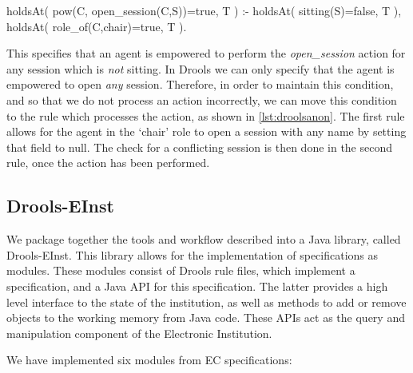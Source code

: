 \begin{prologinline}
holdsAt( pow(C, open_session(C,S))=true, T ) :-
	holdsAt( sitting(S)=false, T ),
	holdsAt( role_of(C,chair)=true, T ).
\end{prologinline}

This specifies that an agent is empowered to perform the \emph{open\_session}
action for any session which is \emph{not} sitting. In Drools we can only
specify that the agent is empowered to open \emph{any} session. Therefore, in
order to maintain this condition, and so that we do not process an action
incorrectly, we can move this condition to the rule which processes the
action, as shown in \autoref{lst:droolsanon}. The first rule allows for the
agent in the `chair' role to open a session with any name by setting that
field to null. The check for a conflicting session is then done in the second
rule, once the action has been performed.


\subsection{Drools-EInst}

We package together the tools and workflow described into a Java library,
called Drools-EInst. This library allows for the implementation of
specifications as modules. These modules consist of Drools rule files, which
implement a specification, and a Java \ac{API} for this specification. The
latter provides a high level interface to the state of the institution, as
well as methods to add or remove objects to the working memory from Java code.
These \ac{API}s act as the query and manipulation component of the Electronic
Institution.

We have implemented six modules from \ac{EC} specifications:

